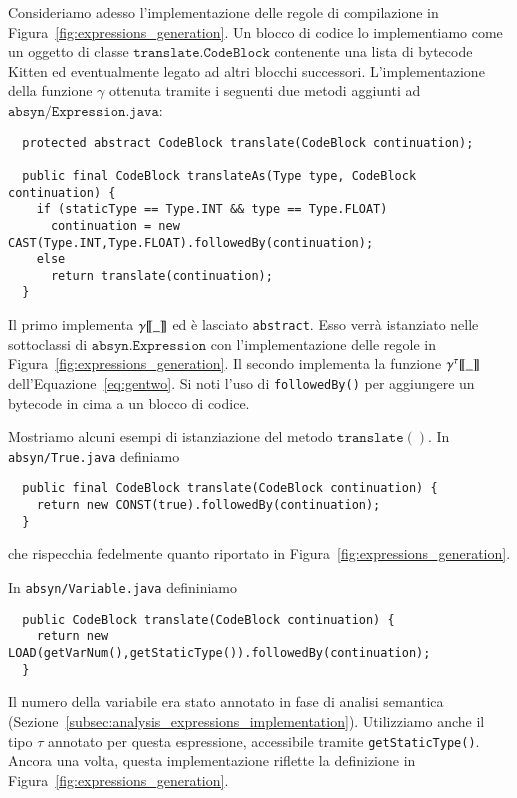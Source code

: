 Consideriamo adesso l'implementazione delle regole di compilazione
in Figura~\ref{fig:expressions_generation}. Un blocco di codice
lo implementiamo come un oggetto di classe
$\mathtt{translate.CodeBlock}$ contenente una lista
di bytecode Kitten ed eventualmente legato ad altri blocchi successori.
L'implementazione della funzione $\gamma$ \e
ottenuta tramite i seguenti due metodi aggiunti
ad $\mathtt{absyn/Expression.java}$:
%
\begin{verbatim}
  protected abstract CodeBlock translate(CodeBlock continuation);

  public final CodeBlock translateAs(Type type, CodeBlock continuation) {
    if (staticType == Type.INT && type == Type.FLOAT)
      continuation = new CAST(Type.INT,Type.FLOAT).followedBy(continuation);
    else
      return translate(continuation);
  }
\end{verbatim}
%
Il primo implementa ${\gamma[\![{\_}]\!]}$ ed
\`e lasciato \texttt{abstract}. Esso verr\`a istanziato nelle
sottoclassi di $\mathtt{absyn.Expression}$
con l'implementazione delle regole in
Figura~\ref{fig:expressions_generation}. Il secondo implementa la funzione
${\gamma^{{\tau}}[\![{\_}]\!]}$ dell'Equazione~\ref{eq:gentwo}. Si noti l'uso di
\texttt{followedBy()} per aggiungere un bytecode in cima a un blocco di codice.

Mostriamo alcuni esempi di istanziazione del metodo
$\mathtt{translate()}$. In \texttt{absyn/True.java} definiamo
%
\begin{verbatim}
  public final CodeBlock translate(CodeBlock continuation) {
    return new CONST(true).followedBy(continuation);
  }
\end{verbatim}
%
che rispecchia fedelmente quanto riportato in
Figura~\ref{fig:expressions_generation}.

In \texttt{absyn/Variable.java} defininiamo
%
\begin{verbatim}
  public CodeBlock translate(CodeBlock continuation) {
    return new LOAD(getVarNum(),getStaticType()).followedBy(continuation);
  }
\end{verbatim}
%
Il numero della variabile era stato annotato in fase di analisi semantica
(Sezione~\ref{subsec:analysis_expressions_implementation}).
Utilizziamo anche il tipo
$\tau$ annotato per questa espressione, accessibile tramite
\texttt{getStaticType()}. Ancora una volta, questa implementazione
riflette la definizione in Figura~\ref{fig:expressions_generation}.

